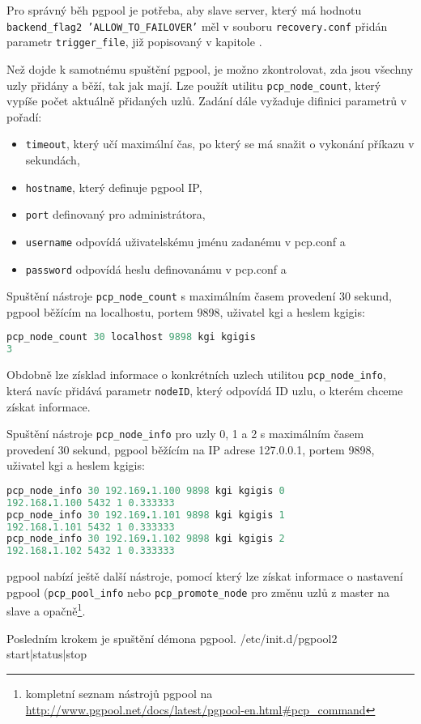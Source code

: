 Pro správný běh pgpool je potřeba, aby slave server, který má hodnotu \texttt{backend\_flag2 'ALLOW\_TO\_FAILOVER'} měl v souboru \texttt{recovery.conf} přidán parametr \texttt{trigger\_file}, již popisovaný v kapitole .

Než dojde k samotnému spuštění pgpool, je možno zkontrolovat, zda jsou všechny uzly přidány a běží, tak jak mají. Lze použít utilitu \texttt{pcp\_node\_count}, který vypíše počet aktuálně přidaných uzlů. Zadání dále vyžaduje difinici parametrů v pořadí:
 \begin{itemize}
\item \texttt{timeout}, který učí maximální čas, po který se má snažit o vykonání příkazu v sekundách,
\item \texttt{hostname}, který definuje pgpool IP,
\item \texttt{port} definovaný pro administrátora,
\item \texttt{username} odpovídá uživatelskému jménu zadanému v pcp.conf a 
\item \texttt{password} odpovídá heslu definovanámu v pcp.conf a

\end{itemize}

Spuštění nástroje \texttt{pcp\_node\_count} s maximálním časem provedení 30 sekund, pgpool běžícím na localhostu, portem 9898, uživatel kgi a heslem kgigis:
\begin{lstlisting}[language=ruby]
pcp_node_count 30 localhost 9898 kgi kgigis
3
\end{lstlisting}

Obdobně lze získlad informace o konkrétních uzlech utilitou \texttt{pcp\_node\_info}, která navíc přidává parametr \texttt{nodeID}, který odpovídá ID uzlu, o kterém chceme získat informace.

Spuštění nástroje \texttt{pcp\_node\_info} pro uzly 0, 1 a 2 s maximálním časem provedení 30 sekund, pgpool běžícím na IP adrese 127.0.0.1, portem 9898, uživatel kgi a heslem kgigis:
\begin{lstlisting}[language=ruby]
pcp_node_info 30 192.169.1.100 9898 kgi kgigis 0
192.168.1.100 5432 1 0.333333
pcp_node_info 30 192.169.1.101 9898 kgi kgigis 1
192.168.1.101 5432 1 0.333333
pcp_node_info 30 192.169.1.102 9898 kgi kgigis 2
192.168.1.102 5432 1 0.333333
\end{lstlisting}

pgpool nabízí ještě další nástroje, pomocí který lze získat informace o nastavení pgpool (\texttt{pcp\_pool\_info} nebo \texttt{pcp\_promote\_node} pro změnu uzlů z master na slave a opačně\footnote{kompletní seznam nástrojů pgpool na \url{http://www.pgpool.net/docs/latest/pgpool-en.html\#pcp\_command}}. 

Posledním krokem je spuštění démona pgpool. 
/etc/init.d/pgpool2 start|status|stop
